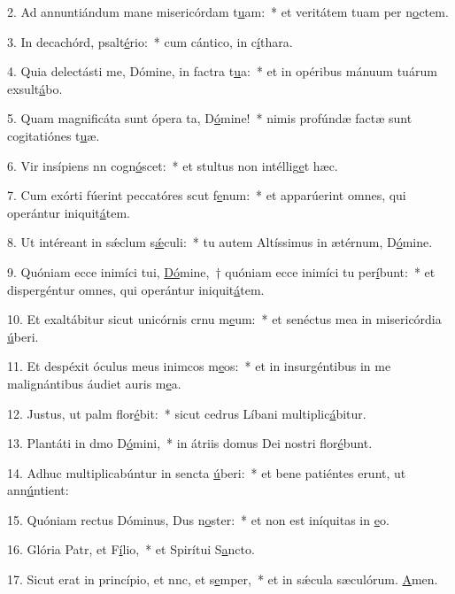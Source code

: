 2. Ad annuntiándum mane misericórdam t\uline{u}am:~* et veritátem tuam per n\uline{o}ctem.\par 
3. In decachórd, psalt\uline{é}rio:~* cum cántico, in c\uline{í}thara.\par 
4. Quia delectásti me, Dómine, in factra t\uline{u}a:~* et in opéribus mánuum tuárum exsult\uline{á}bo.\par 
5. Quam magnificáta sunt ópera ta, D\uline{ó}mine!~* nimis profúndæ factæ sunt cogitatiónes t\uline{u}æ.\par 
6. Vir insípiens nn cogn\uline{ó}scet:~* et stultus non intéllig\uline{e}t hæc.\par 
7. Cum exórti fúerint peccatóres scut f\uline{e}num:~* et apparúerint omnes, qui operántur iniquit\uline{á}tem.\par 
8. Ut intéreant in sǽclum s\uline{ǽ}culi:~* tu autem Altíssimus in ætérnum, D\uline{ó}mine.\par 
9. Quóniam ecce inimíci tui, \uline{Dó}mine,~† quóniam ecce inimíci tu per\uline{í}bunt:~* et dispergéntur omnes, qui operántur iniquit\uline{á}tem.\par 
10. Et exaltábitur sicut unicórnis crnu m\uline{e}um:~* et senéctus mea in misericórdia \uline{ú}beri.\par 
11. Et despéxit óculus meus inimcos m\uline{e}os:~* et in insurgéntibus in me malignántibus áudiet auris m\uline{e}a.\par 
12. Justus, ut palm flor\uline{é}bit:~* sicut cedrus Líbani multiplic\uline{á}bitur.\par 
13. Plantáti in dmo D\uline{ó}mini,~* in átriis domus Dei nostri flor\uline{é}bunt.\par 
14. Adhuc multiplicabúntur in sencta \uline{ú}beri:~* et bene patiéntes erunt, ut ann\uline{ú}ntient:\par 
15. Quóniam rectus Dóminus, Dus n\uline{o}ster:~* et non est iníquitas in \uline{e}o.\par 
16. Glória Patr, et F\uline{í}lio,~* et Spirítui S\uline{a}ncto.\par 
17. Sicut erat in princípio, et nnc, et s\uline{e}mper,~* et in sǽcula sæculórum. \uline{A}men.\par 
